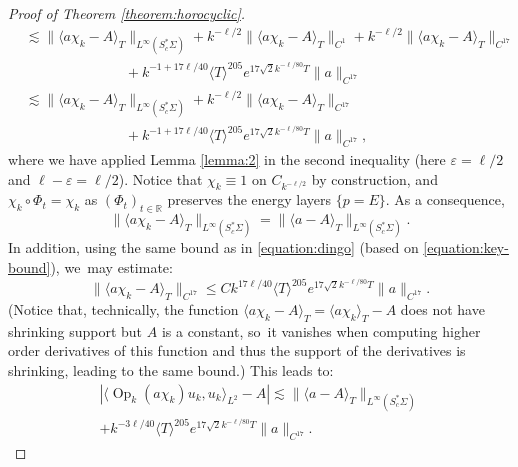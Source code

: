 \documentclass[JEP,XML,SOM,Unicode,published]{cedram}
\theoremstyle{plain}
\theoremstyle{definition}
\newcommand{\R}{\mathbb{R}}
\let\eps\varepsilon
\DeclareMathOperator{\Op}{Op}
\begin{document}
\begin{proof}[Proof of Theorem \ref{theorem:horocyclic}]
\[\begin{split}
& \lesssim \|\langle a \chi_k-A\rangle_T\|_{L^\infty(S^*_c\Sigma)} + k^{-\ell/2} \|\langle a \chi_k-A\rangle_T\|_{C^{1}} + k^{-\ell/2}\|\langle a \chi_k-A\rangle_T\|_{C^{17}}\\
& \hspace{3cm} + k^{-1+17\ell/40} \langle T\rangle^{205} e^{17\sqrt{2}k^{-\ell/80} T} \|a\|_{C^{17}} \\
& \lesssim \|\langle a \chi_k-A\rangle_T\|_{L^\infty(S^*_c\Sigma)} + k^{-\ell/2}\|\langle a \chi_k-A\rangle_T\|_{C^{17}} \\
& \hspace{3cm}+ k^{-1+17\ell/40} \langle T\rangle^{205} e^{17\sqrt{2}k^{-\ell/80} T} \|a\|_{C^{17}},
\end{split}
\]
where we have applied Lemma \ref{lemma:2} in the second inequality (here $\eps = \ell/2$ and $\ell-\eps=\ell/2$). Notice that $\chi_k \equiv 1$ on $C_{k^{-\ell/2}}$ by construction, and $\chi_k \circ \Phi_t = \chi_k$ as $(\Phi_t)_{t \in \R}$ preserves the energy layers $\{p=E\}$. As a consequence,
\[
\|\langle a \chi_k-A\rangle_T\|_{L^\infty(S^*_c\Sigma)} = \|\langle a-A\rangle_T\|_{L^\infty(S^*_c\Sigma)}.
\]
In addition, using the same bound as in \eqref{equation:dingo} (based on \eqref{equation:key-bound}), we~may estimate:
\[
\|\langle a \chi_k-A\rangle_T\|_{C^{17}} \leq C k^{17\ell/40}\langle T\rangle^{205}e^{17\sqrt{2} k^{-\ell/80} T}\|a\|_{C^{17}}.
\]
(Notice that, technically, the function $\langle a \chi_k-A\rangle_T = \langle a\chi_k\rangle_T - A$ does not have shrinking support but $A$ is a constant, so~it vanishes when computing higher order derivatives of this function and thus the support of the derivatives is shrinking, leading to the same bound.) This leads to:
\begin{multline}
\label{equation:la2}
|\langle \Op_k(a \chi_k) u_k,u_k\rangle_{L^2} - A| \lesssim \|\langle a-A\rangle_T\|_{L^\infty(S^*_c\Sigma)}\\
+ k^{-3\ell/40} \langle T\rangle^{205} e^{17\sqrt{2}k^{-\ell/80} T} \|a\|_{C^{17}}.
\end{multline}


\end{proof}
\end{document}
